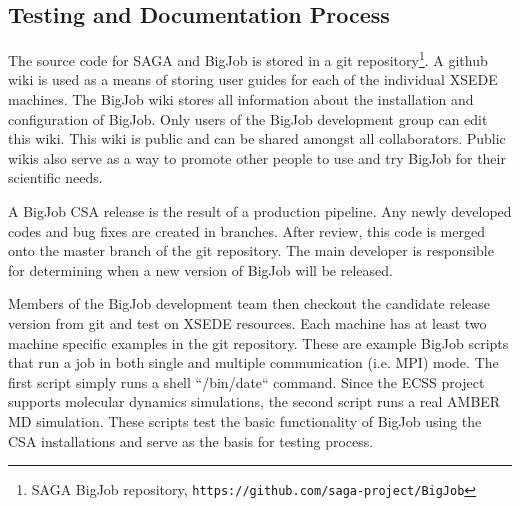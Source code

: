\documentclass{sig-alternate}
\begin{document}
\subsection{Testing and Documentation Process}

The source code for SAGA and BigJob is stored in a git repository\footnote{
SAGA BigJob repository, {\texttt{https://github.com/saga-project/BigJob}}}.
A github wiki is used as a means of storing
user guides for each of the individual XSEDE machines. The BigJob wiki stores
all information about the installation and configuration of BigJob. Only users
of the BigJob development group can edit this wiki. This wiki is public and can
be shared amongst all collaborators. Public wikis also serve as a way to promote
other people to use and try BigJob for their scientific needs.

A BigJob CSA release is the result of a production pipeline. Any newly developed
codes and bug fixes are created in branches. After review, this code is merged
onto the master branch of the git repository. The main developer is responsible
for determining when a new version of BigJob will be released. 

Members of the BigJob development team then checkout the candidate release
version from git and test on XSEDE resources. Each machine has at least two
machine specific examples in the git repository. These are example BigJob
scripts that run a job in both single and multiple communication (i.e. MPI)
mode. The first script simply runs a shell ``/bin/date`` command. Since the ECSS
project supports molecular dynamics simulations, the second script runs a real
AMBER MD simulation. These scripts test the basic functionality of BigJob using
the CSA installations and serve as the basis for testing process.

\end{document}
